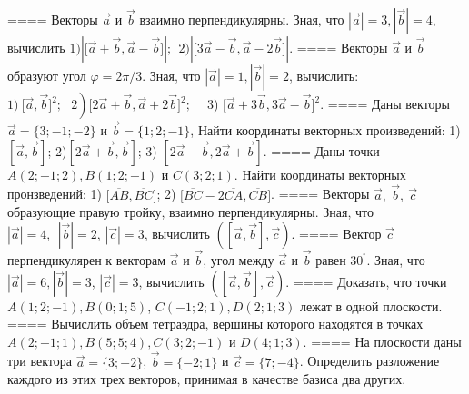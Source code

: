 ====
Векторы \(\overrightarrow{a}\) и \(\overrightarrow{b}\) взаимно перпендикулярны. Зная, что \(|\overrightarrow{a}| = 3,|\overrightarrow{b}| = 4\), вычислить \(1)|\lbrack\overrightarrow{a} + \overrightarrow{b},\overrightarrow{a} - \overrightarrow{b}\rbrack|;\ \ 2)|\lbrack 3\overrightarrow{a} - \overrightarrow{b},\overrightarrow{a} - 2\overrightarrow{b}\rbrack|\).
====
Векторы \(\overrightarrow{a}\) и \(\overrightarrow{b}\) образуют угол \(\varphi = 2\pi/3\). Зная, что \(|\overrightarrow{a}| = 1,|\overrightarrow{b}| = 2\), вычислить: \(1)\left. \ \lbrack\overrightarrow{a},\overrightarrow{b}\rbrack^{2};\ \ \ 2 \right)\lbrack 2\overrightarrow{a} + \overrightarrow{b},\overrightarrow{a} + 2\overrightarrow{b}\rbrack^{2};\ \ \ \ \) 3) \(\lbrack\overrightarrow{a} + 3\overrightarrow{b},3\overrightarrow{a} - \overrightarrow{b}\rbrack^{2}\).
====
Даны векторы \(\overrightarrow{a} = \{ 3; - 1; - 2\}\) и \(\overrightarrow{b} = \{ 1;2; - 1\}\), Найти координаты векторных произведений: 1) \(\left\lbrack \overrightarrow{a},\overrightarrow{b} \right\rbrack\); 2)\(\left\lbrack 2\overrightarrow{a} + \overrightarrow{b},\overrightarrow{b} \right\rbrack\); 3) \(\left\lbrack 2\overrightarrow{a} - \overrightarrow{b},2\overrightarrow{a} + \overrightarrow{b} \right\rbrack\).
====
Даны точки \(A(2; - 1;2),B(1;2; - 1)\) и \(C(3;2;1)\). Найти координаты векторных пронзведений: 1) \(\lbrack\overline{AB},\overline{BC}\rbrack\); 2) \(\lbrack\overline{BC} - 2\overline{CA},\overline{CB}\rbrack\).
====
Векторы \(\overrightarrow{a},\ \overrightarrow{b},\ \overrightarrow{c}\) образующие правую тройку, взаимно перпендикулярны. Зная, что \(|\overrightarrow{a}| = 4,\ \ |\overrightarrow{b}| = 2\), \(|\overrightarrow{c}| = 3\), вычислить \(\left( \left\lbrack \overrightarrow{a},\overrightarrow{b} \right\rbrack,\overrightarrow{c} \right)\).
====
Вектор \(\overrightarrow{c}\) перпендикулярен к векторам \(\overrightarrow{a}\) и \(\overrightarrow{b}\), угол между \(\overrightarrow{a}\) и \(\overrightarrow{b}\) равен \(30^{{^\circ}}\). Зная, что \(|\overrightarrow{a}| = 6,|\overrightarrow{b}| = 3\), \(|\overrightarrow{c}| = 3\), вычислить \(\left( \left\lbrack \overrightarrow{a},\overrightarrow{b} \right\rbrack,\overrightarrow{c} \right)\).
====
Доказать, что точки \(A(1;2; - 1),B(0;1;5)\), \(C( - 1;2;1),D(2;1;3)\) лежат в одной плоскости.
====
Вычислить объем тетраэдра, вершины которого находятся в точках \(A(2; - 1;1),B(5;5;4),C(3;2; - 1)\) и \(D(4;1;3)\).
====
На плоскости даны три вектора \(\overrightarrow{a} = \{ 3; - 2\}\), \(\overrightarrow{b} = \{ - 2;1\}\) и \(\overrightarrow{c} = \{ 7; - 4\}\). Определить разложение каждого из этих трех векторов, принимая в качестве базиса два других.
